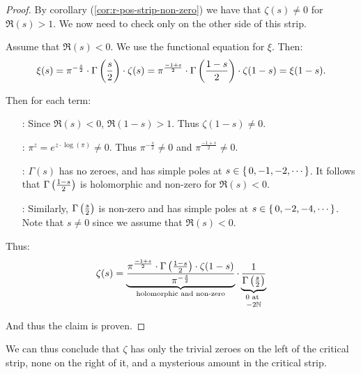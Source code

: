 \begin{proof}
By corollary (\ref{cor:r-pos-strip-non-zero}) we have that $\zeta(s) \neq 0 $ for $\Re(s) > 1$. We now  need to check only on the other side of this strip.

Assume that $\Re(s) < 0$. We use the functional equation for $\xi$. Then:
\begin{align*}
    \xi(s) = \pi^{-\frac{s}{2}} \cdot \Gamma\left( \frac{s}{2} \right) \cdot \zeta(s) = \pi^{\frac{-1+s}{2}} \cdot \Gamma\left( \frac{1-s}{2} \right) \cdot \zeta(1-s) = \xi(1-s).
\end{align*}

Then for each term:
\begin{enumerate}
    \item[\fbox{$\zeta(1-s)$}:] Since $\Re(s) < 0$, $\Re(1-s) > 1$. Thus $\zeta(1-s) \neq 0$.
    \item[\fbox{$\pi^z$}:] $\pi^z = e^{z \cdot \log (\pi)} \neq 0$. Thus $\pi^{-\frac{s}{2}} \neq 0$ and $\pi^{\frac{-1+s}{2}} \neq 0$.
    \item[\fbox{$\Gamma\big(\frac{1-s}{2} \big) $}:] $\Gamma(s)$ has no zeroes, and has simple poles at $s \in \set{ 0, -1, -2, \cdots}$. It follows that $\Gamma\left( \frac{1-s}{2} \right)$ is holomorphic and non-zero for $\Re(s) <0$. 
    \item[\fbox{$\Gamma\br{\frac{s}{2}}$}:] Similarly, $\Gamma\br{\frac{s}{2}}$ is non-zero and has simple poles at $s \in \set{0, -2, -4, \cdots}$. Note that $s \neq 0$ since we assume that $\Re(s) < 0$.
\end{enumerate}
Thus:
\begin{align*}
    \zeta(s) = \underbrace{\frac{\pi^{\frac{-1+s}{2}} \cdot \Gamma\br{\frac{1-s}{2}} \cdot \zeta(1-s)}{\pi^{-\frac{s}{2}}}}_{\text{holomorphic and non-zero}} \cdot  \underbrace{\frac{1}{\Gamma\br{\frac{s}{2}}}}_{\text{\stackanchor{$0$ at }{$-2 \N $}}}
\end{align*}

And thus the claim is proven.

\end{proof}


We can thus conclude that $\zeta$ has only the trivial zeroes on the left of the critical strip, none on the right of it, and a mysterious amount in the critical strip.

